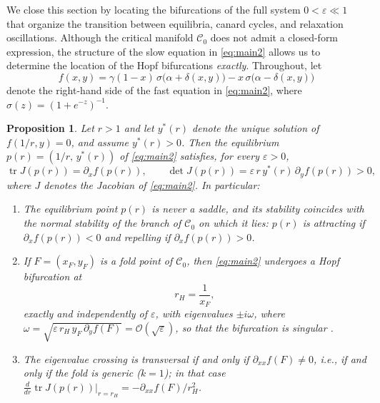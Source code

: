 \documentclass[3p]{elsarticle}
\theoremstyle{plain}
\newtheorem{proposition}{Proposition}[section]
\theoremstyle{remark}
\theoremstyle{definition}
\begin{document}
We close this section by locating the bifurcations of the full system
$0<\varepsilon\ll 1$ that organize the transition between equilibria,
canard cycles, and relaxation oscillations. Although the critical
manifold $\mathcal{C}_0$ does not admit a closed-form expression, the
structure of the slow equation in \eqref{eq:main2} allows us to
determine the location of the Hopf bifurcations \emph{exactly}.
Throughout, let
\begin{equation*}
f(x,y)=\gamma(1-x)\,\sigma\big(\alpha+\delta(x,y)\big)
-x\,\sigma\big(\alpha-\delta(x,y)\big)
\end{equation*}
denote the right-hand side of the fast equation in \eqref{eq:main2},
where $\sigma(z)=\left(1+e^{-z}\right)^{-1}$.
\begin{proposition}
\label{prop:hopf}
Let $r>1$ and let $y^{*}(r)$ denote the unique solution of
$f(1/r,y)=0$, and assume $y^{*}(r)>0$. Then the equilibrium
$p(r)=\left(1/r,\,y^{*}(r)\right)$ of \eqref{eq:main2} satisfies, for
every $\varepsilon>0$,
\begin{equation*}
\operatorname{tr} J(p(r))=\partial_x f(p(r)),
\qquad
\det J(p(r))=\varepsilon\, r\, y^{*}(r)\,\partial_y f(p(r))>0,
\end{equation*}
where $J$ denotes the Jacobian of \eqref{eq:main2}. In particular:
\begin{enumerate}
\item The equilibrium point $p(r)$ is never a saddle, and its stability
coincides with the normal stability of the branch of $\mathcal{C}_0$ on
which it lies: $p(r)$ is attracting if $\partial_x f(p(r))<0$ and
repelling if $\partial_x f(p(r))>0$.
\item If $F=(x_F,y_F)$ is a fold point of $\mathcal{C}_0$, then
\eqref{eq:main2} undergoes a Hopf bifurcation at
\begin{equation*}
r_H=\frac{1}{x_F},
\end{equation*}
exactly and independently of $\varepsilon$, with eigenvalues
$\pm i\omega$, where
$\omega=\sqrt{\varepsilon\, r_H\, y_F\, \partial_y f(F)}
=\mathcal{O}(\sqrt{\varepsilon})$, so that the bifurcation is singular
\cite{Ref:Krupa2001}.
\item The eigenvalue crossing is transversal if and only if
$\partial_{xx}f(F)\neq 0$, i.e., if and only if the fold is generic
($k=1$); in that case
$\frac{d}{dr}\operatorname{tr}J(p(r))\big\vert_{r=r_H}
=-\partial_{xx}f(F)/r_H^{2}$.
\end{enumerate}
\end{proposition}
\end{document}

